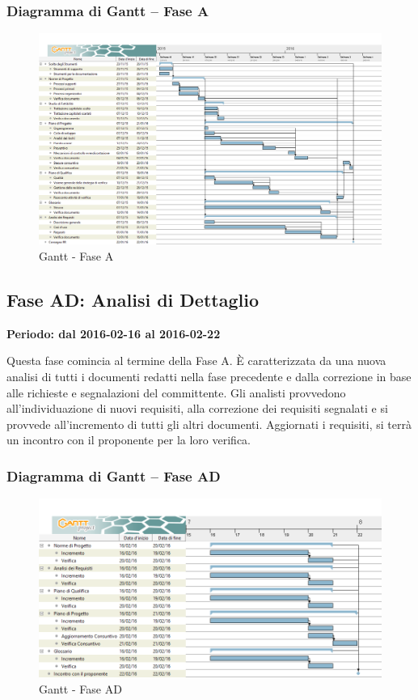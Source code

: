 \documentclass[../PianoProgetto.tex]{subfiles}
\begin{document}
		\subsubsection{Diagramma di Gantt – Fase A}
			\begin{figure}[!h]
				\centering
				\includegraphics[width=\textwidth]{gantt_png/1-analisi}
				\caption{Gantt - Fase A}
				\label{fig:Gantt - Fase A}
			\end{figure}			
	
	\subsection{Fase AD: Analisi di Dettaglio}
		\textbf{Periodo: dal 2016-02-16 al 2016-02-22}

				Questa fase comincia al termine della Fase A. È caratterizzata da una nuova analisi di tutti i documenti redatti nella fase precedente e dalla correzione in base alle richieste e segnalazioni del committente. Gli analisti provvedono all’individuazione di nuovi requisiti, alla correzione dei requisiti segnalati e si provvede all’incremento di tutti gli altri documenti.  Aggiornati i requisiti, si terrà un incontro con il proponente per la loro verifica.
					
		\subsubsection{Diagramma di Gantt – Fase AD}
			\begin{figure}[!h]
				\centering
				\includegraphics[width=\textwidth]{gantt_png/2-analisi_di_dettaglio}
				\caption{Gantt - Fase AD}
				\label{fig:Gantt - Fase AD}
			\end{figure}
\end{document}
